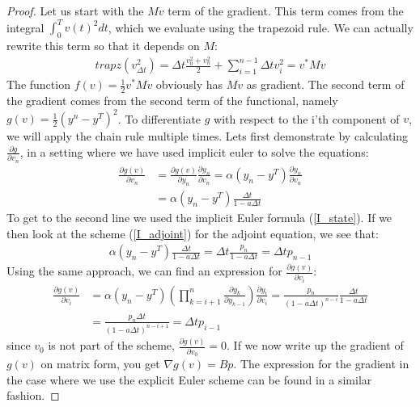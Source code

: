 \begin{proof}
Let us start with the $Mv$ term of the gradient. This term comes from the integral $\int_0^T v(t)^2dt$, which we evaluate using the trapezoid rule. We can actually rewrite this term so that it depends on $M$:
\begin{align*}
trapz(v_{\Delta t}^2)=  \Delta t\frac{v_0^2+v_n^2}{2} + \sum_{i=1}^{n-1} \Delta t v_i^2 = v^*Mv
\end{align*} 
The function $f(v)=\frac{1}{2} v^*Mv$ obviously has $Mv$ as gradient. The second term of the gradient comes from the second term of the functional, namely $g(v)=\frac{1}{2}(y^n -y^T)^2$. To differentiate $g$ with respect to the i'th component of $v$, we will apply the chain rule multiple times. Lets first demonstrate by calculating $\frac{\partial g}{\partial v_n}$, in a setting where we have used implicit euler to solve the equations:
\begin{align*}
\frac{\partial g(v)}{\partial v_n} &= \frac{\partial g(v)}{\partial y_n}\frac{\partial y_n}{\partial v_n} = \alpha(y_n -y^T)\frac{\partial y_n}{\partial v_n}\\
&= \alpha(y_n -y^T)\frac{\Delta t}{1-a\Delta t}
\end{align*}
To get to the second line we used the implicit Euler formula (\ref{I_state}). If we then look at the scheme (\ref{I_adjoint}) for the adjoint equation, we see that:
\begin{align*}
\alpha(y_n -y^T)\frac{\Delta t}{1-a\Delta t} = \Delta t\frac{p_n}{1-a\Delta t} = \Delta t p_{n-1}
\end{align*} 
Using the same approach, we can find an expression for $\frac{\partial g(v)}{\partial v_i}$: 
\begin{align*}
\frac{\partial g(v)}{\partial v_i} &= \alpha(y_n -y^T) (\prod_{k=i+1}^{n}\frac{\partial y_{k}}{\partial y_{k-1}}) \frac{\partial y_i}{\partial v_{i}} = \frac{p_n}{(1-a\Delta t)^{n-i}}\frac{\Delta t}{1-a\Delta t} \\
&= \frac{p_n\Delta t}{(1-a\Delta t)^{n-i+1}}=\Delta t p_{i-1}
\end{align*}
since $v_0$ is not part of the scheme, $\frac{\partial g(v)}{\partial v_0}=0$. If we now write up the gradient of $g(v)$ on matrix form, you get $\nabla g(v) = Bp$. The expression for the gradient in the case where we use the explicit Euler scheme can be found in a similar fashion. 
\end{proof}


